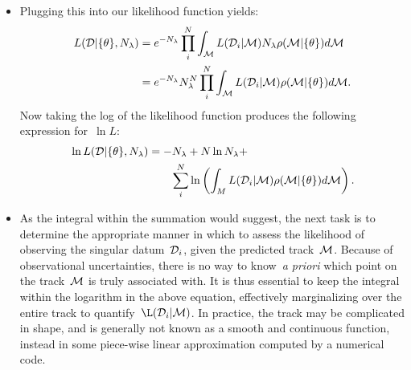 \documentclass[ms.tex]{subfiles}
\begin{document}
\begin{itemize}
	\item Plugging this into our likelihood function yields:
	\begin{subequations}\begin{align}
	L(\mathcal{D} | \{\theta\}, N_\lambda) &= e^{-N_\lambda} \prod_i^N
	\int_{\mathcal{M}} L(\mathcal{D}_i | \mathcal{M}) N_\lambda \rho(\mathcal{M} |
	\{\theta\}) d\mathcal{M}
	\\
	&= e^{-N_\lambda} N_\lambda^N \prod_i^N \int_{\mathcal{M}}
	L(\mathcal{D}_i | \mathcal{M}) \rho(\mathcal{M} | \{\theta\}) d\mathcal{M}.
	\end{align}\end{subequations}
	Now taking the log of the likelihood function produces the following
	expression for~$\ln L$:
	\begin{equation}\begin{split}
	\ln L(\mathcal{D} | \{\theta\}, N_\lambda) &= -N_\lambda + N \ln N_\lambda +
	\\ &\qquad \sum_i^N \ln \left( \int_M L(\mathcal{D}_i | \mathcal{M})
	\rho(\mathcal{M} | \{\theta\}) d\mathcal{M} \right).
	\label{eq:lnL_integral}
	\end{split}\end{equation}

	\item As the integral within the summation would suggest, the next task is
	to determine the appropriate manner in which to assess the likelihood of
	observing the singular datum~$\mathcal{D}_i$, given the predicted
	track~$\mathcal{M}$.
	Because of observational uncertainties, there is no way to know~\textit{a
	priori} which point on the track~$\mathcal{M}$ is truly associated with.
	It is thus essential to keep the integral within the logarithm in the above
	equation, effectively marginalizing over the entire track to
	quantify~$\L(\script{D}_i | \script{M})$.
	In practice, the track may be complicated in shape, and is generally not
	known as a smooth and continuous function, instead in some piece-wise
	linear approximation computed by a numerical code.


\end{itemize}
\end{document}
